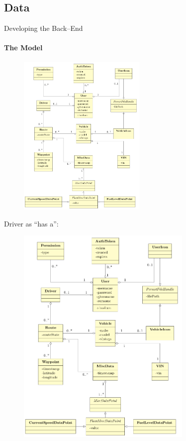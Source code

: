     \subsection{Data}
        \begin{frame}{Developing the Back--End}\framesubtitle{The Model}
             {
            \begin{figure}[htb]
                \centering
                \includegraphics[width=0.55\textwidth]{class_diagram.png}
            \end{figure}
            }

             {
            Driver as ``has a'':
            \begin{figure}[htb]
                \centering
                \includegraphics[width=0.75\textwidth, trim={0 10cm 0 0},clip]{class_diagram.png}
            \end{figure}
            }


\end{frame}
